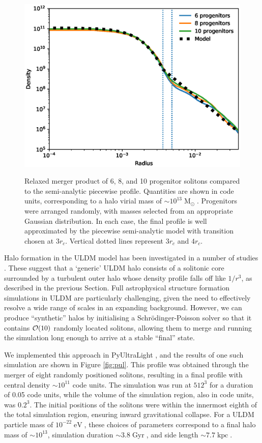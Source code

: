 \documentclass[a4paper,11pt]{article}
\begin{document}
\begin{figure}
\centering
{\includegraphics[scale = 0.7, trim={1cm 0cm 1cm 0.35cm}]{pics/progenitors.eps}} 
\caption{Relaxed merger product of 6, 8, and 10 progenitor solitons compared to the semi-analytic piecewise profile. Quantities are shown in code units, corresponding to a halo virial mass of $\sim 10^{13}\operatorname{M}_{\odot}$.  Progenitors were arranged randomly, with masses selected from an appropriate Gaussian distribution. In each case, the final profile is well approximated by the piecewise semi-analytic model with transition chosen at $3 r_c$. Vertical dotted lines represent $3r_c$ and $4r_c$.  }\label{fig:validity}
\end{figure}


Halo formation in the ULDM model has been investigated in a number of studies \cite{Schwabe:2016rze, Mocz:2017wlg, Lin:2018whl}. These suggest that a `generic' ULDM halo consists of a solitonic core surrounded by a turbulent outer halo whose density profile falls off like $1/r^3$, as described in the previous Section. Full astrophysical structure formation simulations in ULDM are particularly challenging, given the need to effectively resolve a wide range of scales in an expanding background. However, we can produce ``synthetic'' halos by initialising a Schr{\"o}dinger-Poisson solver so that it contains ${\cal{O}}(10)$ randomly located solitons, allowing them to merge and running the simulation long enough to arrive at a stable ``final'' state. 

We  implemented this approach in {\sc PyUltraLight} \cite{Edwards:2018ccc}, and the results of one such simulation are shown in Figure \ref{fig:pul}. This profile was obtained through the merger of eight randomly positioned solitons, resulting in a final profile with central density $\sim 10^{11}$ code units.
The simulation was run at $512^3$ for a duration of 0.05 code units, while the volume of the simulation region, also in code units, was $0.2^3$. The initial positions of the solitons were within the innermost eighth of the total simulation region, ensuring inward gravitational collapse. For a ULDM particle mass of $10^{-22}\operatorname{eV}$, these choices of parameters correspond to a final halo mass of $\sim 10^{13}$, simulation duration $\sim 3.8 \operatorname{Gyr}$, and side length $\sim 7.7 \operatorname{kpc}$. 
\end{document}

